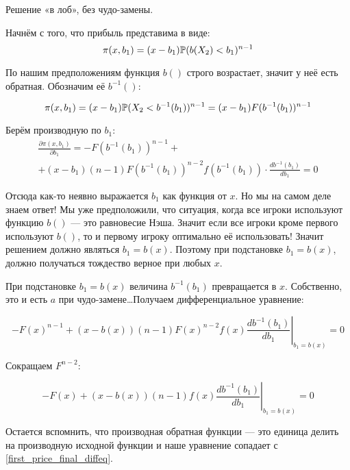 \begin{enumerate}
\begin{myex} Решение «в лоб», без чудо-замены.

Начнём с того, что прибыль представима в виде:
\begin{equation}
\pi(x,b_{1})=(x-b_{1})\P(b(X_{2})<b_{1})^{n-1}
\end{equation}

По нашим предположениям функция $ b() $ строго возрастает, значит у неё есть обратная. Обозначим её $ b^{-1}() $:

\begin{equation}
\pi(x,b_{1})=(x-b_{1})\P(X_{2}<b^{-1}(b_{1}))^{n-1}=(x-b_{1})F(b^{-1}(b_{1}))^{n-1}
\end{equation}

Берём производную по $ b_{1} $:
\begin{multline}
\frac{\partial \pi(x,b_{1})}{\partial b_{1}}=-F(b^{-1}(b_{1}))^{n-1}+\\
+(x-b_{1})(n-1)F(b^{-1}(b_{1}))^{n-2}f(b^{-1}(b_{1}))\cdot \frac{db^{-1}(b_{1})}{db_{1}}=0
\end{multline}

Отсюда как-то неявно выражается $ b_{1} $ как функция от $ x $. Но мы на самом деле знаем ответ! Мы уже предположили, что ситуация, когда все игроки используют функцию $ b() $ — это равновесие Нэша. Значит если все игроки кроме первого используют $ b() $, то и первому игроку оптимально её использовать! Значит решением должно являться $ b_{1}=b(x) $. Поэтому при подстановке $ b_{1}=b(x) $, должно получаться тождество верное при любых $ x $.

При подстановке $ b_{1}=b(x) $ величина $ b^{-1}(b_{1}) $ превращается в $ x $. Собственно, это и есть $ a $ при чудо-замене\ldots Получаем дифференциальное уравнение:

\begin{equation}
-F(x)^{n-1}+(x-b(x))(n-1)F(x)^{n-2}f(x)\left.\frac{db^{-1}(b_{1})}{db_{1}}\right|_{b_{1}=b(x)}=0
\end{equation}

Сокращаем $ F^{n-2} $:

\begin{equation}
-F(x)+(x-b(x))(n-1)f(x)\left.\frac{db^{-1}(b_{1})}{db_{1}}\right|_{b_{1}=b(x)}=0
\end{equation}

Остается вспомнить, что производная обратная функции — это единица делить на производную исходной функции и наше уравнение сопадает с \ref{first_price_final_diffeq}.
\end{myex}


\end{enumerate}
